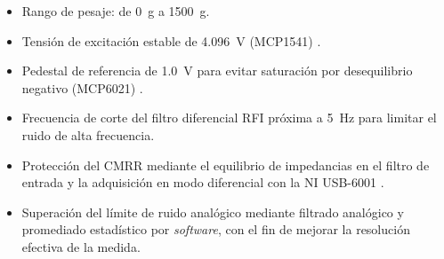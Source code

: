 \begin{itemize}
      \item Rango de pesaje: de \SI{0}{\g} a \SI{1500}{\g}.
      \item Tensión de excitación estable de \SI{4.096}{\V}
            (MCP1541) \cite{microchip_mcp1525_2012}.
      \item Pedestal de referencia de \SI{1.0}{\V} para evitar
            saturación por desequilibrio negativo (MCP6021) \cite{mcp6021_datasheet}.
      \item Frecuencia de corte del filtro diferencial RFI próxima
            a \SI{5}{\Hz} para limitar el ruido de alta frecuencia.
      \item Protección del CMRR mediante el equilibrio de impedancias
            en el filtro de entrada y la adquisición en modo
            diferencial con la NI USB-6001 \cite{ni6001_datasheet}.
      \item Superación del límite de ruido analógico mediante
            filtrado analógico y promediado estadístico por
            \textit{software}, con el fin de mejorar la resolución
            efectiva de la medida.
\end{itemize}
